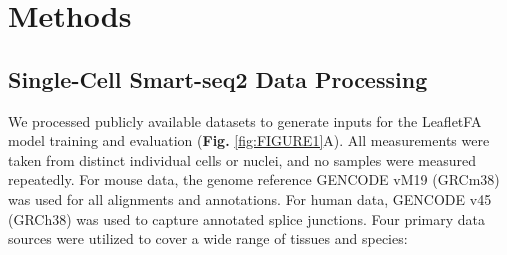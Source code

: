 \section*{Methods}\label{Methods}
\subsection*{Single-Cell Smart-seq2 Data Processing}
We processed publicly available datasets to generate inputs for the LeafletFA model training and evaluation (\textbf{Fig.} \ref{fig:FIGURE1}A). All measurements were taken from distinct individual cells or nuclei, and no samples were measured repeatedly. For mouse data, the genome reference GENCODE vM19 (GRCm38) was used for all alignments and annotations. For human data, GENCODE v45 (GRCh38) was used to capture annotated splice junctions. Four primary data sources were utilized to cover a wide range of tissues and species:


